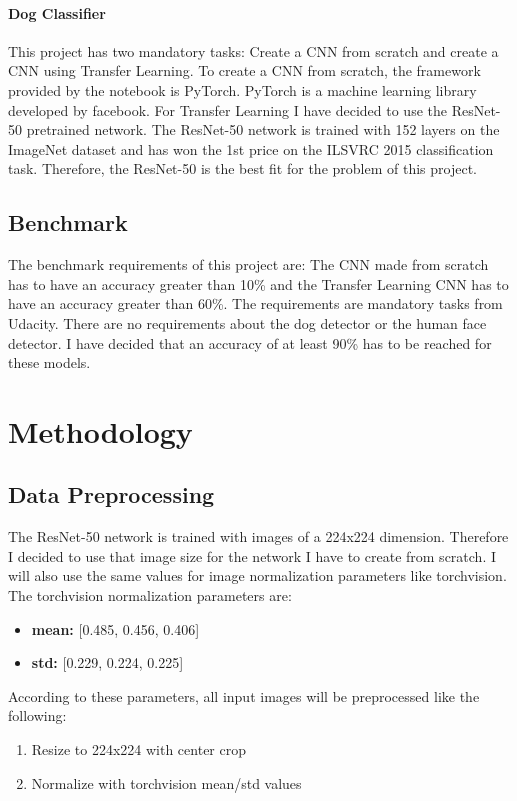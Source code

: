 \documentclass{article}
\begin{document}
\paragraph{Dog Classifier} This project has two mandatory tasks: Create a CNN from scratch and create a CNN using Transfer Learning. To create a CNN from scratch, the framework provided by the notebook is PyTorch. PyTorch is a machine learning library developed by facebook.\newline
For Transfer Learning I have decided to use the ResNet-50 pretrained network. The ResNet-50 network is trained with 152 layers on the ImageNet dataset and has won the 1st price on the ILSVRC 2015 classification task. Therefore, the ResNet-50 is the best fit for the problem of this project.

\subsection{Benchmark}
The benchmark requirements of this project are: The CNN made from scratch has to have an accuracy greater than 10\% and the Transfer Learning CNN has to have an accuracy greater than 60\%. The requirements are mandatory tasks from Udacity.\newline
There are no requirements about the dog detector or the human face detector. I have decided that an accuracy of at least 90\% has to be reached for these models.

\section{Methodology} \label{s_methodology}

\subsection{Data Preprocessing} \label{su_preprocessing}
The ResNet-50 network is trained with images of a 224x224 dimension. Therefore I decided to use that image size for the network I have to create from scratch. I will also use the same values for image normalization parameters like torchvision. The torchvision normalization parameters are:
\begin{itemize}
    \item \textbf{mean:} [0.485, 0.456, 0.406]
    \item \textbf{std:} [0.229, 0.224, 0.225]
\end{itemize}
According to these parameters, all input images will be preprocessed like the following:
\begin{enumerate}
	\item Resize to 224x224 with center crop
	\item Normalize with torchvision mean/std values
\end{enumerate}
\end{document}
